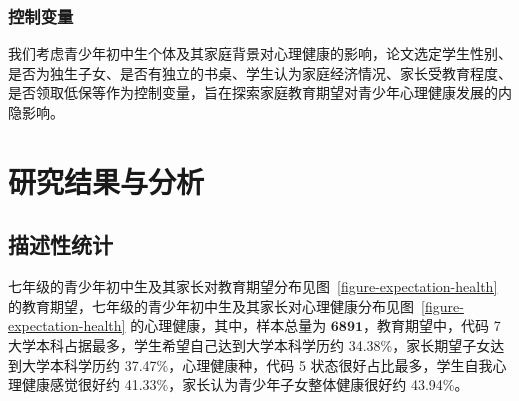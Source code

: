 \documentclass[zihao = -4, linespread = 1.5]{article}
\begin{document}
\subsubsection{控制变量}
我们考虑青少年初中生个体及其家庭背景对心理健康的影响，论文选定学生性别、是否为独生子女、是否有独立的书桌、学生认为家庭经济情况、家长受教育程度、是否领取低保等作为控制变量，旨在探索家庭教育期望对青少年心理健康发展的内隐影响。



\section{研究结果与分析}
\subsection{描述性统计}
七年级的青少年初中生及其家长对教育期望分布见图~\ref{figure-expectation-health} 的教育期望，七年级的青少年初中生及其家长对心理健康分布见图~\ref{figure-expectation-health} 的心理健康，其中，样本总量为 $\bm{6891}$，教育期望中，代码 7 大学本科占据最多，学生希望自己达到大学本科学历约 34.38\%，家长期望子女达到大学本科学历约 37.47\%，心理健康种，代码 5 状态很好占比最多，学生自我心理健康感觉很好约 41.33\%，家长认为青少年子女整体健康很好约 43.94\%。
\end{document}
